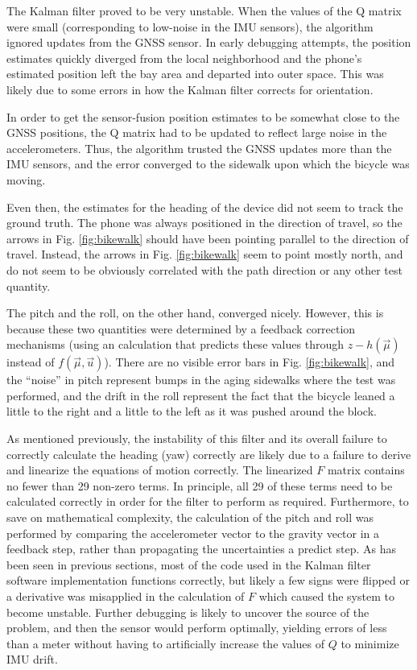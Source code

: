 \documentclass[10pt]{article}
\begin{document}
The Kalman filter proved to be very unstable. When the values of the Q matrix were small (corresponding to low-noise in the IMU sensors), the algorithm ignored updates from the GNSS sensor. In early debugging attempts, the position estimates quickly diverged from the local neighborhood and the phone's estimated position left the bay area and departed into outer space. This was likely due to some errors in how the Kalman filter corrects for orientation.

In order to get the sensor-fusion position estimates to be somewhat close to the GNSS positions, the Q matrix had to be updated to reflect large noise in the accelerometers. Thus, the algorithm trusted the GNSS updates more than the IMU sensors, and the error converged to the sidewalk upon which the bicycle was moving.

Even then, the estimates for the heading of the device did not seem to track the ground truth. The phone was always positioned in the direction of travel, so the arrows in Fig. \ref{fig:bikewalk} should have been pointing parallel to the direction of travel. Instead, the arrows in Fig. \ref{fig:bikewalk} seem to point mostly north, and do not seem to be obviously correlated with the path direction or any other test quantity.

The pitch and the roll, on the other hand, converged nicely. However, this is because these two quantities were determined by a feedback correction mechanisms (using an calculation that predicts these values through $z - h(\vec \mu)$ instead of $f(\vec\mu, \vec u)$). There are no visible error bars in Fig. \ref{fig:bikewalk}, and the ``noise'' in pitch represent bumps in the aging sidewalks where the test was performed, and the drift in the roll represent the fact that the bicycle leaned a little to the right and a little to the left as it was pushed around the block.

As mentioned previously, the instability of this filter and its overall failure to correctly calculate the heading (yaw) correctly are likely due to a failure to derive and linearize the equations of motion correctly. The linearized $F$ matrix contains no fewer than 29 non-zero terms. In principle, all 29 of these terms need to be calculated correctly in order for the filter to perform as required. Furthermore, to save on mathematical complexity, the calculation of the pitch and roll was performed by comparing the accelerometer vector to the gravity vector in a feedback step, rather than propagating the uncertainties a predict step. As has been seen in previous sections, most of the code used in the Kalman filter software implementation functions correctly, but likely a few signs were flipped or a derivative was misapplied in the calculation of $F$ which caused the system to become unstable. Further debugging is likely to uncover the source of the problem, and then the sensor would perform optimally, yielding errors of less than a meter without having to artificially increase the values of $Q$ to minimize IMU drift.
\end{document}

